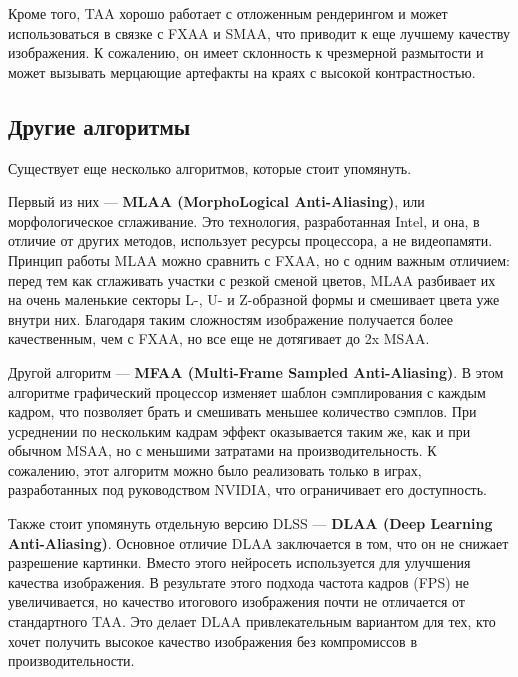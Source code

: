 Кроме того, TAA хорошо работает с отложенным рендерингом и может использоваться в связке с FXAA и SMAA, что приводит к еще лучшему качеству изображения. К сожалению, он имеет склонность к чрезмерной размытости и может вызывать мерцающие артефакты на краях с высокой контрастностью.

\subsection{Другие алгоритмы}
Существует еще несколько алгоритмов, которые стоит упомянуть.

Первый из них —\textbf{ MLAA (MorphoLogical Anti-Aliasing)}, или морфологическое сглаживание. Это технология, разработанная Intel, и она, в отличие от других методов, использует ресурсы процессора, а не видеопамяти. Принцип работы MLAA можно сравнить с FXAA, но с одним важным отличием: перед тем как сглаживать участки с резкой сменой цветов, MLAA разбивает их на очень маленькие секторы L-, U- и Z-образной формы и смешивает цвета уже внутри них. Благодаря таким сложностям изображение получается более качественным, чем с FXAA, но все еще не дотягивает до 2x MSAA.

Другой алгоритм — \textbf{MFAA (Multi-Frame Sampled Anti-Aliasing)}. В этом алгоритме графический процессор изменяет шаблон сэмплирования с каждым кадром, что позволяет брать и смешивать меньшее количество сэмплов. При усреднении по нескольким кадрам эффект оказывается таким же, как и при обычном MSAA, но с меньшими затратами на производительность. К сожалению, этот алгоритм можно было реализовать только в играх, разработанных под руководством NVIDIA, что ограничивает его доступность.

Также стоит упомянуть отдельную версию DLSS — \textbf{DLAA (Deep Lear\-ning Anti-Aliasing)}. Основное отличие DLAA заключается в том, что он не снижает разрешение картинки. Вместо этого нейросеть используется для улучшения качества изображения. В результате этого подхода частота кадров (FPS) не увеличивается, но качество итогового изображения почти не отличается от стандартного TAA. Это делает DLAA привлекательным вариантом для тех, кто хочет получить высокое качество изображения без компромиссов в производительности.
